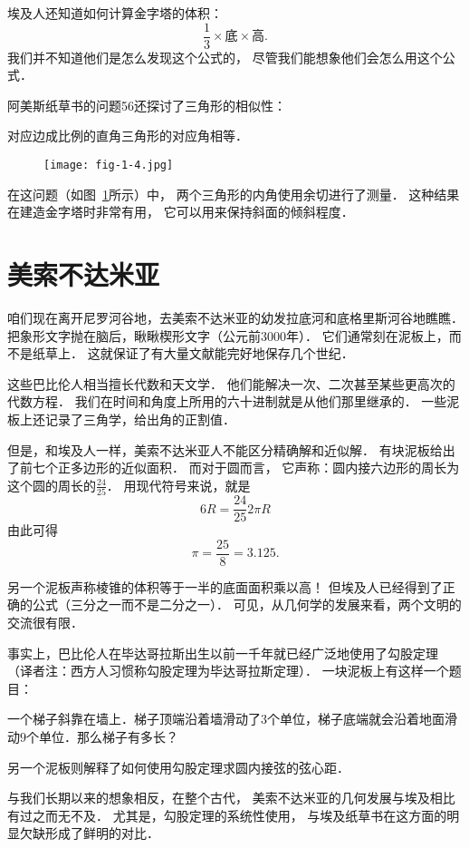 \documentclass[cn,fancy,blue,11pt]{elegantbook}
\begin{document}
埃及人还知道如何计算金字塔的体积：
\[\frac{1}{3}\times\textrm{底}\times\textrm{高}.\]
我们并不知道他们是怎么发现这个公式的，
尽管我们能想象他们会怎么用这个公式．

阿美斯纸草书的问题56还探讨了三角形的相似性：
\begin{framed}
	对应边成比例的直角三角形的对应角相等．
\end{framed}
\begin{figure}[htbp]
	\centering
	\texttt{[image: fig-1-4.jpg]}
	\caption{\label{fig:1-4}}
\end{figure}
在这问题（如图~\ref{fig:1-4}所示）中，
两个三角形的内角使用余切进行了测量．
这种结果在建造金字塔时非常有用，
它可以用来保持斜面的倾斜程度．

\section{美索不达米亚}

咱们现在离开尼罗河谷地，去美索不达米亚的幼发拉底河和底格里斯河谷地瞧瞧．
把象形文字抛在脑后，瞅瞅楔形文字（公元前3000年）．
它们通常刻在泥板上，而不是纸草上．
这就保证了有大量文献能完好地保存几个世纪．

这些巴比伦人相当擅长代数和天文学．
他们能解决一次、二次甚至某些更高次的代数方程．
我们在时间和角度上所用的六十进制就是从他们那里继承的．
一些泥板上还记录了三角学，给出角的正割值．

但是，和埃及人一样，美索不达米亚人不能区分精确解和近似解．
有块泥板给出了前七个正多边形的近似面积．
而对于圆而言，
它声称：圆内接六边形的周长为这个圆的周长的$\frac{24}{25}$．
用现代符号来说，就是
\[6R=\frac{24}{25}2\pi R\]
由此可得
\[\pi=\frac{25}{8}=3.125.\]

另一个泥板声称棱锥的体积等于一半的底面面积乘以高！
但埃及人已经得到了正确的公式（三分之一而不是二分之一）．
可见，从几何学的发展来看，两个文明的交流很有限．

事实上，巴比伦人在毕达哥拉斯出生以前一千年就已经广泛地使用了勾股定理
（译者注：西方人习惯称勾股定理为毕达哥拉斯定理）．
一块泥板上有这样一个题目：
\begin{framed}
	一个梯子斜靠在墙上．梯子顶端沿着墙滑动了$3$个单位，梯子底端就会沿着地面滑动$9$个单位．那么梯子有多长？
\end{framed}
另一个泥板则解释了如何使用勾股定理求圆内接弦的弦心距．

与我们长期以来的想象相反，在整个古代，
美索不达米亚的几何发展与埃及相比有过之而无不及．
尤其是，勾股定理的系统性使用，
与埃及纸草书在这方面的明显欠缺形成了鲜明的对比．
\end{document}
